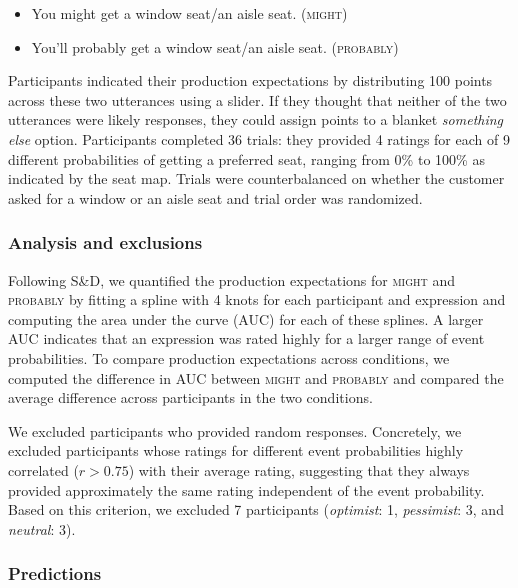 \begin{itemize}
    \item You might get a window seat/an aisle seat. (\textsc{might})
    \item You'll probably get a window seat/an aisle seat. (\textsc{probably})
\end{itemize}

Participants indicated their production expectations by distributing 100 points across these two utterances using a slider. If they thought that neither of the two utterances were likely responses, they could assign points to a blanket \textit{something else} option. Participants completed 36 trials: they provided  4 ratings for each of 9 different probabilities of getting a preferred seat, ranging from 0\% to 100\% as indicated by the seat map. Trials were counterbalanced on whether the customer asked for a window or an aisle seat and trial order was randomized.


\subsubsection{Analysis and exclusions}

Following S\&D, we quantified the production expectations for \textsc{might} and \textsc{probably} by fitting a spline with 4 knots for each participant and expression and computing the area under the curve (AUC) for each of these splines. A larger AUC indicates that an expression was rated highly for a larger range of event probabilities. To compare production expectations across conditions, we computed the difference in AUC between \textsc{might} and \textsc{probably} and compared the average difference across participants in the two conditions.

We excluded participants who provided random responses. Concretely, we excluded participants whose ratings for different event probabilities highly correlated ($r>0.75$) with their average rating, suggesting that they always provided approximately the same rating independent of the event probability. Based on this criterion, we excluded 7 participants (\textit{optimist}: 1, \textit{pessimist}: 3, and \textit{neutral}: 3).

\subsubsection{Predictions}

